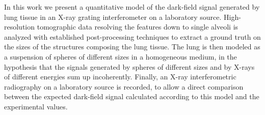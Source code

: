 In this work we present a quantitative model of the dark-field signal
generated by lung tissue in an X-ray grating interferometer on a laboratory
source. High-resolution tomographic data resolving the features down to single
alveoli is analyzed with established post-processing techniques to extract a
ground truth on the sizes of the structures composing the lung tissue. The
lung is then modeled as a suspension of spheres of different sizes in a
homogeneous medium, in the hypothesis that the signals generated by spheres
of different sizes and by X-rays of different energies sum up incoherently.
Finally, an X-ray interferometric radiography on a laboratory source is
recorded, to allow a direct comparison between the expected dark-field
signal calculated according to this model and the experimental values.
